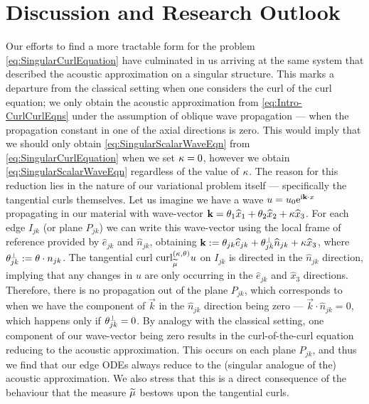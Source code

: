 \section{Discussion and Research Outlook} \label{sec:CC-Discussion}
Our efforts to find a more tractable form for the problem \eqref{eq:SingularCurlEquation} have culminated in us arriving at the same system that described the acoustic approximation on a singular structure.
This marks a departure from the classical setting when one considers the curl of the curl equation; we only obtain the acoustic approximation from \eqref{eq:Intro-CurlCurlEqns} under the assumption of oblique wave propagation --- when the propagation constant in one of the axial directions is zero.
This would imply that we should only obtain \eqref{eq:SingularScalarWaveEqn} from \eqref{eq:SingularCurlEquation} when we set $\kappa=0$, however we obtain \eqref{eq:SingularScalarWaveEqn} regardless of the value of $\kappa$.%
The reason for this reduction lies in the nature of our variational problem itself --- specifically the tangential curls themselves.
Let us imagine we have a wave $u = u_0\mathrm{e}^{\mathrm{i}\mathbf{k}\cdot x}$ propagating in our material with wave-vector $\mathbf{k} = \theta_1\widehat{x}_1 + \theta_2\widehat{x}_2 + \kappa\widehat{x}_3$.
For each edge $I_{jk}$ (or plane $P_{jk}$) we can write this wave-vector using the local frame of reference provided by $\widehat{e}_{jk}$ and $\widehat{n}_{jk}$, obtaining $\mathbf{k} := \theta_{jk}\widehat{e}_{jk} + \theta_{jk}^\perp\widehat{n}_{jk} + \kappa\widehat{x}_3$, where $\theta_{jk}^\perp := \theta\cdot n_{jk}$.
The tangential curl $\mathrm{curl}_{\widetilde{\mu}}^{\left( \kappa, \theta \right)}u$ on $I_{jk}$ is directed in the $\widehat{n}_{jk}$ direction, implying that any changes in $u$ are only occurring in the $\widehat{e}_{jk}$ and $\widehat{x}_3$ directions.
Therefore, there is no propagation out of the plane $P_{jk}$, which corresponds to when we have the component of $\vec{k}$ in the $\widehat{n}_{jk}$ direction being zero --- $\vec{k}\cdot\widehat{n}_{jk}=0$, which happens only if $\theta_{jk}^\perp=0$.
By analogy with the classical setting, one component of our wave-vector being zero results in the curl-of-the-curl equation reducing to the acoustic approximation.
This occurs on each plane $P_{jk}$, and thus we find that our edge ODEs always reduce to the (singular analogue of the) acoustic approximation.
We also stress that this is a direct consequence of the behaviour that the measure $\widetilde{\mu}$ bestows upon the tangential curls.
